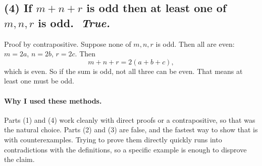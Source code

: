\documentclass[11pt]{article}
\begin{document}
\subsection*{(4) If $m+n+r$ is odd then at least one of $m,n,r$ is odd. \,\,\textit{True.}}
Proof by contrapositive. Suppose none of $m,n,r$ is odd. Then all are even: $m=2a$, $n=2b$, $r=2c$. Then
\[
m+n+r = 2(a+b+c),
\]
which is even. So if the sum is odd, not all three can be even. That means at least one must be odd.

\paragraph{Why I used these methods.}
Parts (1) and (4) work cleanly with direct proofs or a contrapositive, so that was the natural choice. 
Parts (2) and (3) are false, and the fastest way to show that is with counterexamples. 
Trying to prove them directly quickly runs into contradictions with the definitions, so a specific example is enough to disprove the claim.
\end{document}
